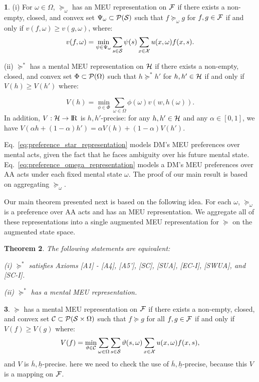 \documentclass[11pt,oneside]{article}
\theoremstyle{plain}
\theoremstyle{plain}
\theoremstyle{plain}
\newtheorem{thm}{Theorem}[section]
\theoremstyle{plain}
\theoremstyle{plain}
\theoremstyle{definition}
\newtheorem{defn}[thm]{\protect\definitionname}
\theoremstyle{definition}
\theoremstyle{remark}
\theoremstyle{plain}
\providecommand{\definitionname}{Definition}
\newcommand{\R}{{\rm I\!R}}
\newcommand{\F}{{\cal F}}
\newcommand{\ulh}{\underline{h}}
\newcommand{\olh}{\overline{h}}
\newcommand{\pfo}{\pf_\omega}
\newcommand{\mcs}{{\cal S}}
\newcommand{\mcx}{{\cal X}}
\newcommand{\pf}{\succeq}
\newcommand{\pfs}{\succeq^*}
\newcommand{\convmix}[2]{\alpha #1 + (1-\alpha) #2}
\newcommand{\wh}[1]{{\color{blue} #1     }}
\begin{document}
\begin{defn}
\label{defn:representation_pfs}
(i) For $\omega \in \Omega$, $\pfo$ has an MEU representation on $\F$ if there exists a non-empty, closed, and convex set $\Psi_\omega \subset {\cal P}(\mcs)$ such that $f \pfo g$ for $f,g \in \F$ if and only if $v(f,\omega) \geq v(g,\omega)$, where:
\begin{equation}
\label{eq:preference_omega_representation}
v(f,\omega) = \min_{\psi \in \Psi_\omega} \sum_{s \in \mathcal{S}} \psi(s) \sum_{x \in \mcx}u(x,\omega)f(x,s).
\end{equation} 


(ii) $\pfs$ has a mental MEU representation on ${\cal H}$ if there exists a non-empty, closed, and convex set $\Phi \subset {\cal P}(\Omega)$ such that $h \pfs h'$ for $h,h' \in {\cal H}$ if and only if $V(h) \geq V(h')$ where:

\begin{equation}
\label{eq:preference_star_representation}
V(h) = \min_{\phi \in \Phi} \sum_{\omega \in \Omega}\phi(\omega)v(w,h(\omega)).
\end{equation}
In addition, $V:{\cal H}\to \R$ is $h,h'$-precise: for any $h,h' \in {\cal H}$ and any $\alpha \in [0,1]$, we have $V(\convmix{h}{h'}) = \convmix{V(h)}{V(h')}$.
\end{defn}

Eq.~\eqref{eq:preference_star_representation} models DM's MEU preferences over mental acts, given the fact that he faces ambiguity over his future mental state.
Eq.~\eqref{eq:preference_omega_representation} models a DM's MEU preferences over AA acts under each fixed mental state $\omega$.
The proof of our main result is based on aggregating $\pfo$.

Our main theorem presented next is based on the following idea. For each $\omega$, $\pfo$ is a preference over AA acts and has an MEU representation. We aggregate all of these representations into a single augmented MEU representation for $\pf$ on the augmented state space.

\begin{thm}
\label{thm:mental_DPRO}
The following statements are equivalent:

(i) $\pfs$ satisfies Axioms [A1] - [A4], [A5'], [SC], [SUA], [EC-I], [SWUA], and [SC-I].

(ii) $\pfs$ has a mental MEU representation.
\end{thm}

\begin{defn}
\label{defn:representation_pf}
$\pf$ has a mental MEU representation on $\F$ if there exists a non-empty, closed, and convex set ${\cal C} \subset {\cal P}(\mcs \times \Omega)$ such that $f \pf g$ for all $f,g \in \F$ if and only if $V(f) \geq V(g)$ where:
\begin{equation}
\label{eq:preference_representation}
V(f) = \min_{\vartheta \in \mathcal{C}} \sum_{\omega\in \Omega}\sum_{s \in \mcs} \vartheta(s,\omega) \sum_{x\in \mcx}u(x,\omega)f(x,s),
\end{equation}
and $V$ is $\olh,\ulh$-precise. \wh{here we need to check the use of $\olh,\ulh$-precise, because this $V$ is a mapping on $\F$.}
\end{defn}
\end{document}
